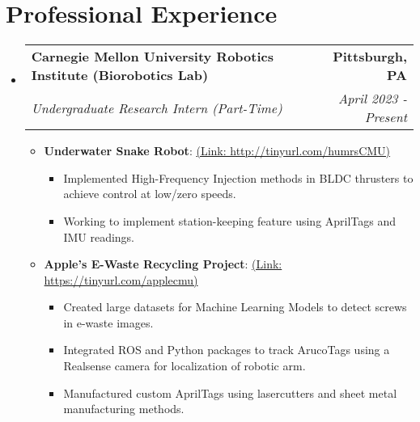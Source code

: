 \documentclass[letterpaper,10pt]{article}
\makeatletter
\newcommand{\resumeItem}[2]{
  \item\small{
    \textbf{#1}{: #2 \vspace{-2pt}}
  }
}
\newcommand{\resumeSubheading}[4]{
  \vspace{-1pt}\item
    \begin{tabular*}{0.97\textwidth}{l@{\extracolsep{\fill}}r}
      \textbf{#1} & \textbf{#2} \\
      \textit{#3} & \textit{#4} \\
    \end{tabular*}\vspace{-5pt}
}
\newcommand{\resumeSubHeadingListStart}{\begin{itemize}[leftmargin=*]}
\newcommand{\resumeSubHeadingListEnd}{\end{itemize}}
\newcommand{\resumeItemListStart}{\begin{itemize}}
\newcommand{\resumeItemListEnd}{\end{itemize}\vspace{-5pt}}
\makeatother
\begin{document}
\section{Professional Experience}
    \resumeSubHeadingListStart
        \resumeSubheading
            {Carnegie Mellon University Robotics Institute (Biorobotics Lab)}{Pittsburgh, PA}
            {Undergraduate Research Intern (Part-Time)}{April 2023 -  Present}
            \resumeItemListStart
                \resumeItem{Underwater Snake Robot}
                    {\href{http://tinyurl.com/humrsCMU}{(Link: http://tinyurl.com/humrsCMU)}}
                    \begin{itemize}
                      \item Implemented High-Frequency Injection methods in BLDC thrusters to achieve control at low/zero speeds.
                      \item Working to implement station-keeping feature using AprilTags and IMU readings.
                    \end{itemize}
                \resumeItem{Apple's E-Waste Recycling Project}
                    {\href{https://tinyurl.com/applecmu}{(Link: https://tinyurl.com/applecmu)}}
                    \begin{itemize}
                      \item Created large datasets for Machine Learning Models to detect screws in e-waste images.
                      \item Integrated ROS and Python packages to track ArucoTags using a Realsense camera for localization of robotic arm.
                      \item Manufactured custom AprilTags using lasercutters and sheet metal manufacturing methods.
                    \end{itemize}
            \resumeItemListEnd
      \resumeSubHeadingListEnd
\vspace{-5pt}
\end{document}
